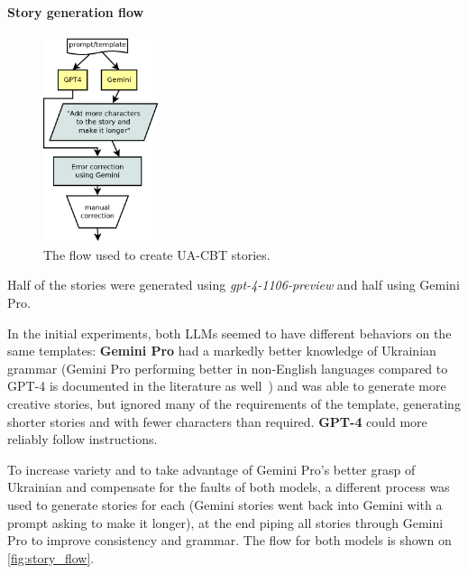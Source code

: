 \paragraph{Story generation flow} 

\begin{figure}
    \centering
    \includegraphics[width=0.3\textwidth]{Figures/story_flow.png}
    \caption[UA-CBT story generation flow]{The flow used to create UA-CBT stories.}
    \label{fig:story_flow}
\end{figure}

Half of the stories were generated using \textit{gpt-4-1106-preview} and half using Gemini Pro. 

In the initial experiments, both LLMs seemed to have different behaviors on the same templates:
\textbf{Gemini Pro} had a markedly better knowledge of Ukrainian grammar 
(Gemini Pro performing better in non-English languages 
 compared to GPT-4 is documented in the literature as well~\cite{akter_-depth_2023})
and was able to generate more creative stories, but ignored many of the requirements of the template, generating shorter stories and with fewer characters than required. 
\textbf{GPT-4} could more reliably follow instructions.

To increase variety and to take advantage of Gemini Pro's better grasp of Ukrainian and compensate for the faults of both models, a different process was used to generate stories for each (Gemini stories went back into Gemini with a prompt asking to make it longer), at the end piping all stories through Gemini Pro to improve consistency and grammar.  
The flow for both models is shown on \autoref{fig:story_flow}. 

